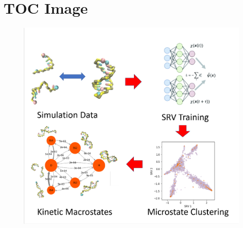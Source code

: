 \documentclass[journal=jpcbfk,manuscript=article]{achemso}
\begin{document}
\clearpage
\newpage

%


%


\clearpage
\newpage

\section*{TOC Image}

\begin{figure}[ht!]
	\begin{center} 
        \includegraphics[width=150mm, scale=1]{TOC.pdf}
        \label{fig:TOC}
	\end{center}
\end{figure}
\end{document}
